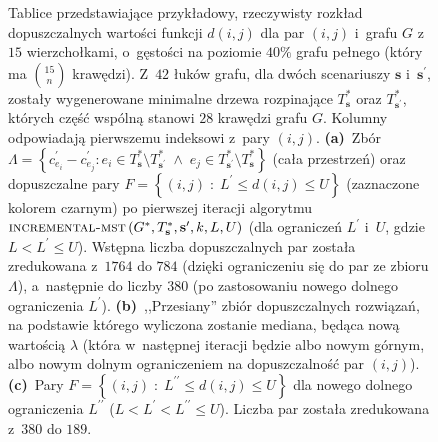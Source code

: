 \begin{figure}[!h]
\begin{subfigure}[b]{0.3\textwidth}
{\begin{tabu}{|c|c|c|c|c|c|c|c|c|c|c|c|c|c|c|c|c|c|c|c|c|c|c|c|c|c|c|c|}
			\end{tabu}%
		}
		\caption{}
		\label{fig:imstSeed:c}
	\end{subfigure}
	\hfill\null
	\caption{
		Tablice przedstawiające przykładowy, rzeczywisty rozkład dopuszczalnych wartości funkcji $d \left( i, j \right)$ dla par $\left( i, j \right)$ i~grafu $G$ z~$15$ wierzchołkami, o~gęstości na poziomie $40\%$ grafu pełnego (który ma $\binom{15}{n}$ krawędzi). Z~$42$ łuków grafu, dla dwóch scenariuszy $\textbf{s}$ i~$\textbf{s}^{\prime}$, zostały wygenerowane minimalne drzewa rozpinające $T^{\ast}_{\textbf{s}}$ oraz $T^{\ast}_{\textbf{s}^{\prime}}$, których część wspólną stanowi $28$ krawędzi grafu $G$. Kolumny odpowiadają pierwszemu indeksowi z~pary $\left( i, j \right)$.
		\textbf{(a)}~Zbór $\Lambda = \left\{ c^{\prime}_{e_{i}} - c^{\prime}_{e_{j}} : e_{i} \in T^{\ast}_{\textbf{s}} \setminus T^{\ast}_{\textbf{s}^{\prime}} \; \wedge \; e_{j} \in T^{\ast}_{\textbf{s}^{\prime}} \setminus T^{\ast}_{\textbf{s}} \right\}$ (cała przestrzeń) oraz dopuszczalne pary $F = \left\{ \left( i, j \right) \; : \; L^{\prime} \leqslant d \left( i, j \right) \leqslant U \right\}$ (zaznaczone kolorem czarnym) po pierwszej iteracji algorytmu $\textsc{incremental-mst} \left( G^{\ast}, T^{\ast}_{\textbf{s}}, \textbf{s}^{\prime}, k, L, U \right)$ (dla ograniczeń $L^{\prime}$ i~$U$, gdzie $L < L^{\prime} \leqslant U$). Wstępna liczba dopuszczalnych par została zredukowana z~$1764$ do $784$ (dzięki ograniczeniu się do par ze zbioru $\Lambda$), a~następnie do liczby $380$ (po zastosowaniu nowego dolnego ograniczenia $L^{\prime}$).
		\textbf{(b)}~,,Przesiany'' zbiór dopuszczalnych rozwiązań, na podstawie którego wyliczona zostanie mediana, będąca nową wartością $\lambda$ (która w~następnej iteracji będzie albo nowym górnym, albo nowym dolnym ograniczeniem na dopuszczalność par $\left( i, j \right)$).
		\textbf{(c)}~Pary $F = \left\{ \left( i, j \right) \; : \; L^{\prime\prime} \leqslant d \left( i, j \right) \leqslant U \right\}$ dla nowego dolnego ograniczenia $L^{\prime\prime}$ ($L < L^{\prime} < L^{\prime\prime} \leqslant U$). Liczba par została zredukowana z~$380$ do $189$.
	}
	\label{fig:imstSeed}
\end{figure}

